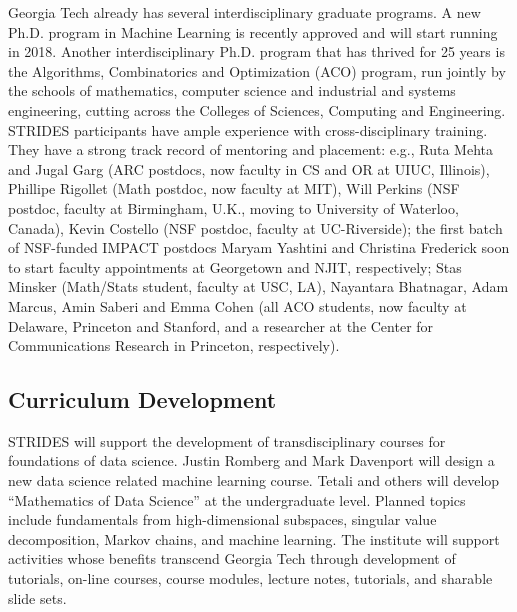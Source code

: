 \documentclass[12pt]{article}
\begin{document}
Georgia Tech already has several interdisciplinary graduate programs.
A new Ph.D. program in Machine Learning is recently approved and will start running in 2018.
Another interdisciplinary Ph.D. program that has thrived for 25 years is the Algorithms, Combinatorics and Optimization (ACO) program, run jointly by the schools of mathematics, computer science and industrial and systems engineering, cutting across the Colleges of Sciences, Computing and Engineering.
STRIDES participants have ample experience with cross-disciplinary training.
They have a strong track record of mentoring and placement: e.g.,
Ruta Mehta and Jugal Garg (ARC postdocs, now faculty in CS and OR at UIUC, Illinois),
Phillipe Rigollet (Math postdoc, now faculty at MIT),
Will Perkins (NSF postdoc, faculty at Birmingham, U.K., moving to University of Waterloo, Canada),
Kevin Costello (NSF postdoc, faculty at UC-Riverside);
the first batch of NSF-funded IMPACT postdocs Maryam Yashtini and Christina Frederick soon to start faculty appointments at Georgetown and NJIT, respectively;
Stas Minsker (Math/Stats student, faculty at USC, LA),
Nayantara Bhatnagar, Adam Marcus, Amin Saberi and Emma Cohen (all ACO students, now faculty at Delaware, Princeton and Stanford, and a researcher at the Center for Communications Research in Princeton, respectively).



\subsection{Curriculum Development}
\label{sec:courses}

STRIDES will support the development of transdisciplinary courses for foundations of data
science. Justin Romberg and Mark Davenport will design a new data science related machine
learning course. Tetali and others will develop ``Mathematics of Data Science'' at the undergraduate level.
Planned topics include fundamentals from high-dimensional subspaces,
singular value decomposition,
Markov chains, and machine learning.
The institute will support activities whose benefits transcend Georgia Tech through
development of tutorials, on-line courses, course modules, lecture notes, tutorials, and
sharable slide sets.
\end{document}
